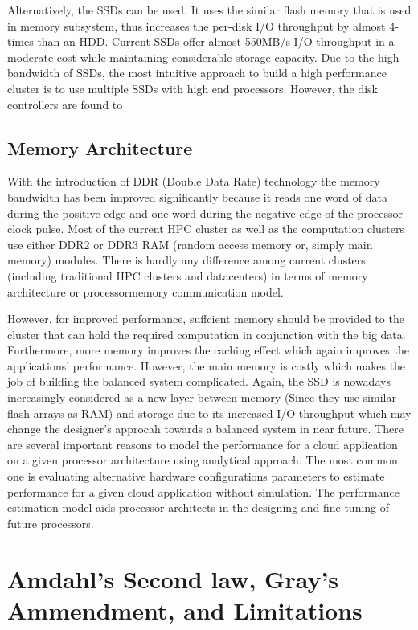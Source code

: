 \documentclass[journal]{IEEEtran}
\begin{document}
Alternatively, the SSDs can be used. It uses the similar flash
memory that is used in memory subsystem, thus increases the
per-disk I/O throughput by almost 4-times than an HDD. Current
SSDs offer almost 550MB/s I/O throughput in a moderate
cost while maintaining considerable storage capacity. Due
to the high bandwidth of SSDs, the most intuitive approach to
build a high performance cluster is to use multiple SSDs with
high end processors. However, the disk controllers are found to

\subsection{Memory Architecture}
With the introduction of DDR (Double Data Rate) technology
the memory bandwidth has been improved significantly because
it reads one word of data during the positive edge and
one word during the negative edge of the processor clock pulse.
Most of the current HPC cluster as well as the computation clusters use either DDR2 or DDR3 RAM (random access memory
or, simply main memory) modules. There is hardly any difference
among current clusters (including traditional HPC clusters
and datacenters) in terms of memory architecture or processormemory communication model. 

However, for improved performance, suffcient memory should be provided to the cluster that can hold the required computation in conjunction with the big data. Furthermore, more memory improves the caching effect which again improves the applications’ performance. However, the main memory is costly which makes the job of building the balanced system complicated. Again, the SSD is nowadays increasingly considered as a new layer between memory (Since they use similar flash arrays as RAM) and storage due to its increased I/O throughput which may change the designer’s approcah towards a balanced system in near future. There are several important reasons to model the performance for a cloud application on a given processor architecture using analytical approach. The most common one is evaluating alternative hardware configurations parameters to estimate performance for a given cloud application without simulation. The performance estimation model aids processor architects in the designing and fine-tuning of future processors.

\section{Amdahl's Second law, Gray's Ammendment, and Limitations} \label{Sec:AmdahlGray}
\end{document}

